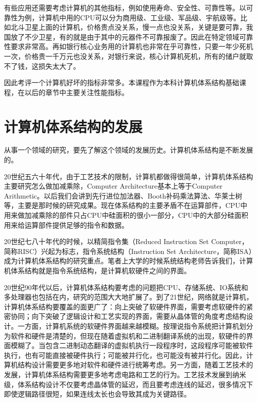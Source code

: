 \documentclass[]{ctexbook}
\begin{document}
有些应用还需要考虑计算机的其他指标，例如使用寿命、安全性、可靠性等。以可靠性为例，计算机中用的CPU可以分为商用级、工业级、军品级、宇航级等。比如北斗卫星上面的计算机，价格贵点没关系，慢一点也没关系，关键是要可靠，我国放了不少卫星，有的就是由于其中的元器件不可靠报废了。因此在特定领域可靠性要求非常高。再如银行核心业务用的计算机也非常在乎可靠性，只要一年少死机一次，价格贵一千万元也没关系，对银行来说，核心计算机死机，所有的储户就取不了钱，这损失太大了。

因此考评一个计算机好坏的指标非常多。本课程作为本科计算机体系结构基础课程，在以后的章节中主要关注性能指标。

\hypertarget{ux8ba1ux7b97ux673aux4f53ux7cfbux7ed3ux6784ux7684ux53d1ux5c55}{%
\section{计算机体系结构的发展}\label{ux8ba1ux7b97ux673aux4f53ux7cfbux7ed3ux6784ux7684ux53d1ux5c55}}

从事一个领域的研究，要先了解这个领域的发展历史。计算机体系结构是不断发展的。

20世纪五六十年代，由于工艺技术的限制，计算机都做得很简单，计算机体系结构主要研究怎么做加减乘除，Computer Architecture基本上等于Computer Arithmetic。以后我们会讲到先行进位加法器、Booth补码乘法算法、华莱士树等，主要是那时候的研究成果。现在体系结构的主要矛盾不在运算部件，CPU中用来做加减乘除的部件只占CPU中硅面积的很小一部分，CPU中的大部分硅面积用来给运算部件提供足够的指令和数据。

20世纪七八十年代的时候，以精简指令集（Reduced Instruction Set Computer，简称RISC）兴起为标志，指令系统结构（Instruction Set Architecture，简称ISA）成为计算机体系结构的研究重点。笔者上大学的时候系统结构老师告诉我们，计算机体系结构就是指令系统结构，是计算机软硬件之间的界面。

20世纪90年代以后，计算机体系结构要考虑的问题把CPU、存储系统、IO系统和多处理器也包括在内，研究的范围大大地扩展了。到了21世纪，网络就是计算机，计算机体系结构要覆盖的面更广了：向上突破了软硬件界面，需要考虑软硬件的紧密协同；向下突破了逻辑设计和工艺实现的界面，需要从晶体管的角度考虑结构设计。一方面，计算机系统的软硬件界面越来越模糊。按理说指令系统把计算机划分为软件和硬件是清楚的，但现在随着虚拟机和二进制翻译系统的出现，软硬件的界面模糊了。当包含二进制动态翻译的虚拟机执行一段程序时，这段程序可能被软件执行，也有可能直接被硬件执行；可能被并行化，也可能没有被并行化。因此，计算机结构设计需要更多地对软件和硬件进行统筹考虑。另一方面，随着工艺技术的发展，计算机体系结构需要更多地考虑电路和工艺的行为。工艺技术发展到纳米级，体系结构设计不仅要考虑晶体管的延迟，而且要考虑连线的延迟，很多情况下即使逻辑路径很短，如果连线太长也会导致其成为关键路径。
\end{document}

